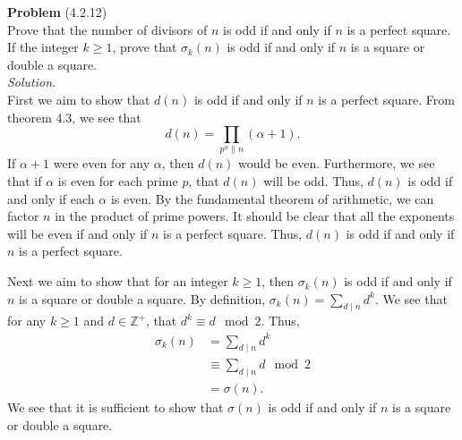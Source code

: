 \documentclass[12 pt]{amsart}
\begin{document}
\noindent
\textbf{Problem} (4.2.12) \\[4ex]
  Prove that the number of divisors of $n$ is odd if and only if $n$ is
  a perfect square. 
  If the integer $k \geq 1$, prove that $\sigma_k(n)$ is odd
  if and only if $n$ is a square or double a square.
  \\[2ex]
\emph{Solution.} \\[2ex]
  First we aim to show that $d(n)$ is odd if and only if $n$
  is a perfect square.
  From theorem 4.3, we see that 
  \[
    d(n) = \prod_{p^{\alpha} \parallel n} (\alpha + 1).
  \]
  If $\alpha + 1$ were even for any $\alpha$, then 
  $d(n)$ would be even.
  Furthermore, we see that if $\alpha$ is even for 
  each prime $p$, that $d(n)$ will be odd.
  Thus, $d(n)$ is odd if and only if each $\alpha$
  is even.
  By the fundamental theorem of arithmetic, we can factor
  $n$ in the product of prime powers.
  It should be clear that all the exponents will be even
  if and only if $n$ is a perfect square.
  Thus, $d(n)$ is odd if and only if $n$ is a perfect square.

  Next we aim to show that 
  for an integer $k \geq 1$, then $\sigma_k(n)$ is odd
  if and only if $n$ is a square or double a square.
  By definition, $\sigma_k(n) = \sum_{d \mid n} d^k$.
  We see that for any $k \geq 1$ and $d \in \mathbb{Z}^+$, that
  $d^k \equiv d \mod 2$.
  Thus, 
  \begin{align*}
    \sigma_k(n) &= \sum_{d \mid n} d^k \\
                &\equiv \sum_{d \mid n} d \mod 2\\
                &= \sigma(n).
  \end{align*}
  We see that it is sufficient to show that $\sigma(n)$ is 
  odd if and only if $n$ is a square or double a square.
  
\end{document}
